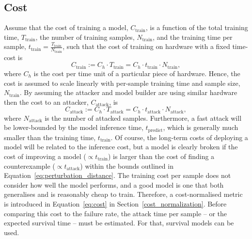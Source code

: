 \subsection{Cost}
\label{cost}

Assume that the cost of training a model, $C_{\mathrm{train}}$, is a function of the total training time, $T_{\mathrm{train}}$, the number of training samples, $N_{\mathrm{train}}$, and the training time per sample, $t_{\mathrm{train}} = \frac{T_{\mathrm{train}}}{N_{\mathrm{train}}}$, such that the cost of training on hardware with a fixed time-cost is
\begin{equation}
    C_{\mathrm{train}} := C_{h} \cdot T_{\mathrm{train}} = C_h \cdot t_{\mathrm{train}} \cdot N_{\mathrm{train}},
    \label{eq:naive_cost}
\end{equation}
where $C_h$ is the cost per time unit of a particular piece of hardware. Hence, the cost is assumed to scale linearly with per-sample training time and sample size, $N_{\mathrm{train}}$. By assuming the attacker and model builder are using similar hardware then the cost to an attacker, $C_{\mathrm{attack}}$, is
\[
    C_{\mathrm{attack}} := C_{h} \cdot T_{\mathrm{attack}} = C_h \cdot t_{\mathrm{attack}} \cdot N_{\mathrm{attack}},
\]
where $ N_{\mathrm{attack}} $ is the number of attacked samples. Furthermore, a fast attack will be lower-bounded by the model inference time, $ t_{\mathrm{predict}} $, which is generally much smaller than the training time, $ t_{\mathrm{train}} $. Of course, the long-term costs of deploying a model will be related to the inference cost, but a model is clearly broken if the cost of improving a model ($\propto t_{\mathrm{train}}$) is larger than the cost of finding a counterexample ($\propto t_{\mathrm{attack}}$) within the bounds outlined in Equation~\ref{eq:perturbation_distance}. The training cost per sample does not consider how well the model performs, and a good model is one that both generalises and is reasonably cheap to train.
Therefore, a cost-normalised metric is introduced in Equation~\ref{eq:cost} in Section~\ref{cost_normalization}. Before comparing this cost to the failure rate, the attack time per sample -- or the expected survival time --  must be estimated. For that, survival models can be used.
